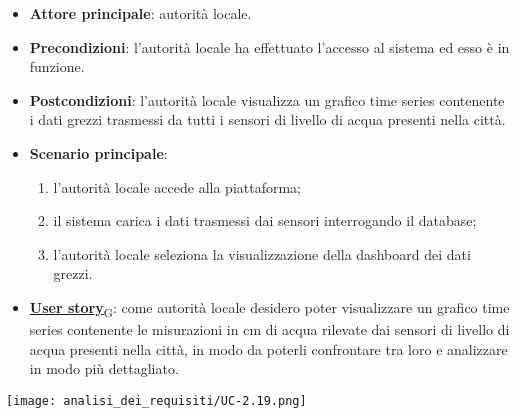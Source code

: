 \begin{itemize}
	\item \textbf{Attore principale}: autorità locale.
	\item \textbf{Precondizioni}: l'autorità locale ha effettuato l'accesso al sistema ed esso è in funzione.
	\item \textbf{Postcondizioni}: l'autorità locale visualizza un grafico time series contenente i dati grezzi trasmessi da tutti i sensori
	      di livello di acqua presenti nella città.
	\item \textbf{Scenario principale}:
	      \begin{enumerate}
		      \item l'autorità locale accede alla piattaforma;
		      \item il sistema carica i dati trasmessi dai sensori interrogando il database;
		      \item l'autorità locale seleziona la visualizzazione della dashboard dei dati grezzi.
	      \end{enumerate}
	\item \href{https://7last.github.io/docs/rtb/documentazione-interna/glossario\#user-story}{\textbf{User story}\textsubscript{G}}:
	      come autorità locale desidero poter visualizzare un grafico time series contenente le misurazioni in cm di acqua rilevate dai sensori
	      di livello di acqua presenti nella città, in modo da poterli confrontare tra loro e analizzare in modo più dettagliato.
\end{itemize}
\begin{center}
	\texttt{[image: analisi\_dei\_requisiti/UC-2.19.png]}
\end{center}


